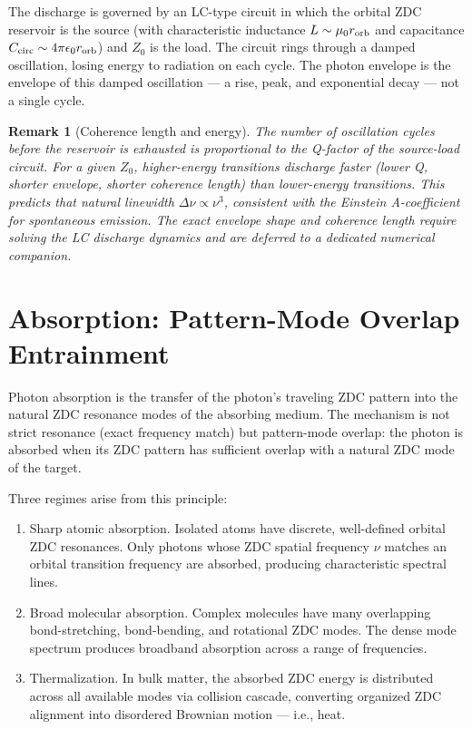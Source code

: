 \documentclass[12pt]{article}
\newtheorem{remark}[theorem]{Remark}
\begin{document}
The discharge is governed by an LC-type circuit in which the orbital ZDC reservoir is the source (with characteristic inductance \(L \sim \mu_0 r_{\rm orb}\) and capacitance \(C_{\rm circ} \sim 4\pi\epsilon_0 r_{\rm orb}\)) and \(Z_0\) is the load. The circuit rings through a damped oscillation, losing energy to radiation on each cycle. The photon envelope is the envelope of this damped oscillation — a rise, peak, and exponential decay — not a single cycle.

\begin{remark}[Coherence length and energy]
The number of oscillation cycles before the reservoir is exhausted is proportional to the Q-factor of the source-load circuit. For a given \(Z_0\), higher-energy transitions discharge faster (lower Q, shorter envelope, shorter coherence length) than lower-energy transitions. This predicts that natural linewidth \(\Delta\nu \propto \nu^3\), consistent with the Einstein A-coefficient for spontaneous emission. The exact envelope shape and coherence length require solving the LC discharge dynamics and are deferred to a dedicated numerical companion.
\end{remark}

\section{Absorption: Pattern-Mode Overlap Entrainment}
Photon absorption is the transfer of the photon’s traveling ZDC pattern into the natural ZDC resonance modes of the absorbing medium. The mechanism is not strict resonance (exact frequency match) but pattern-mode overlap: the photon is absorbed when its ZDC pattern has sufficient overlap with a natural ZDC mode of the target.

Three regimes arise from this principle:
\begin{enumerate}[noitemsep]
\item Sharp atomic absorption. Isolated atoms have discrete, well-defined orbital ZDC resonances. Only photons whose ZDC spatial frequency \(\nu\) matches an orbital transition frequency are absorbed, producing characteristic spectral lines.
\item Broad molecular absorption. Complex molecules have many overlapping bond-stretching, bond-bending, and rotational ZDC modes. The dense mode spectrum produces broadband absorption across a range of frequencies.
\item Thermalization. In bulk matter, the absorbed ZDC energy is distributed across all available modes via collision cascade, converting organized ZDC alignment into disordered Brownian motion — i.e., heat.
\end{enumerate}
\end{document}

